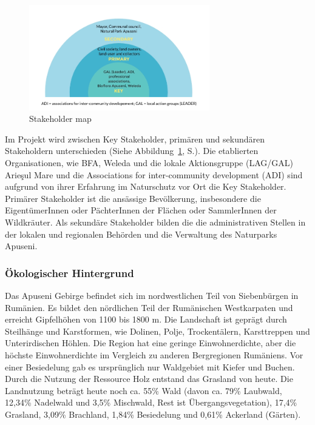 \begin{figure}[htb]
 \centering
 \includegraphics[width=0.7\textwidth,angle=0]{abb/Stakeholder-map}
 \caption{Stakeholder map \citep[In Anlehnung an][]{DBU2018}}
\label{fig:stakeholdermap}
\end{figure}

Im Projekt wird zwischen Key Stakeholder, primären und sekundären Stakeholdern unterschieden (Siehe Abbildung~\ref{fig:stakeholdermap}, S.\pageref{fig:stakeholdermap}). Die etablierten Organisationen, wie BFA, Weleda und die lokale Aktionsgruppe (LAG/GAL) Arieşul Mare und die Associations for inter-community development (ADI) sind aufgrund von ihrer Erfahrung im Naturschutz vor Ort die Key Stakeholder. Primärer Stakeholder ist die ansässige Bevölkerung, insbesondere die EigentümerInnen oder PächterInnen der Flächen oder SammlerInnen der Wildkräuter. Als sekundäre Stakeholder bilden die die administrativen Stellen in der lokalen und regionalen Behörden und die Verwaltung des Naturparks Apuseni.

\subsubsection{Ökologischer Hintergrund}

Das Apuseni Gebirge befindet sich im nordwestlichen Teil von Siebenbürgen in Rumänien. Es bildet den nördlichen Teil der Rumänischen Westkarpaten und erreicht Gipfelhöhen von 1100 bis 1800 m. Die Landschaft ist geprägt durch Steilhänge und Karstformen, wie Dolinen, Polje, Trockentälern, Karsttreppen und Unterirdischen Höhlen. Die Region hat eine geringe Einwohnerdichte, aber die höchste Einwohnerdichte im Vergleich zu anderen Bergregionen Rumäniens. Vor einer Besiedelung gab es ursprünglich nur Waldgebiet mit Kiefer und Buchen. Durch die Nutzung der Ressource Holz entstand das Grasland von heute. Die Landnutzung beträgt heute noch ca. 55\% Wald (davon ca. 79\% Laubwald, 12,34\% Nadelwald und 3,5\% Mischwald, Rest ist Übergangsvegetation), 17,4\% Grasland, 3,09\% Brachland, 1,84\% Besiedelung und 0,61\% Ackerland (Gärten).

